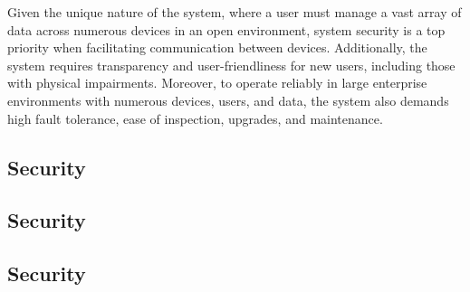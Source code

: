 \documentclass[../Main.tex]{subfiles}
\begin{document}
Given the unique nature of the system, where a user must manage a vast array of data across numerous devices in an open environment, system security is a top priority when facilitating communication between devices. Additionally, the system requires transparency and user-friendliness for new users, including those with physical impairments. Moreover, to operate reliably in large enterprise environments with numerous devices, users, and data, the system also demands high fault tolerance, ease of inspection, upgrades, and maintenance.
\subsection{Security}
\hfill
\subsection{Security}
\hfill
\subsection{Security}
\hfill
\end{document}
